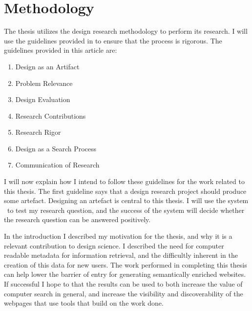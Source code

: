 
\chapter{Methodology} %

\label{Methodology} %


The thesis utilizes the design research methodology to perform its research.
I will use the guidelines provided in \citet{Hevner2004} to ensure that the process is rigorous.
The guidelines provided in this article are:
\begin{enumerate}
	\item \label{gl1}Design as an Artifact
	\item \label{gl2}Problem Relevance
	\item \label{gl3}Design Evaluation
	\item \label{gl4}Research Contributions
	\item \label{gl5}Research Rigor
	\item \label{gl6}Design as a Search Process
	\item \label{gl7}Communication of Research
\end{enumerate}

I will now explain how I intend to follow these guidelines for the work related to this thesis.
The first guideline says that a design research project should produce some artefact.
Designing an artefact is central to this thesis.
I will use the system \theartefact\ to test my research question,
and the success of the system will decide whether the research question can be answered positively.

In the introduction I described my motivation for the thesis, and why it is a relevant contribution to design science.
I described the need for computer readable metadata for information retrieval,
and the difficultly inherent in the creation of this data for new users.
The work performed in completing this thesis can help lower the barrier of entry for generating semantically enriched websites.
If successful I hope to that the results can be used to both increase the value of computer search in general,
and increase the visibility and discoverability of the webpages that use tools that build on the work done.


